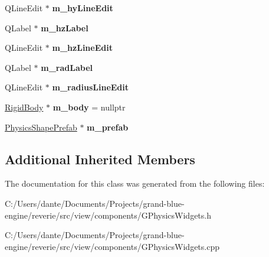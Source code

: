 \begin{DoxyCompactItemize}
\mbox{\label{classrev_1_1_view_1_1_physics_geometry_widget_a55538da4e7cc7f5175d896ad53b861d6}} 
Q\+Line\+Edit $\ast$ {\bfseries m\+\_\+hy\+Line\+Edit}
\item 
\mbox{\label{classrev_1_1_view_1_1_physics_geometry_widget_ab5dd9e36704cd247a9746c7bad36e3c9}} 
Q\+Label $\ast$ {\bfseries m\+\_\+hz\+Label}
\item 
\mbox{\label{classrev_1_1_view_1_1_physics_geometry_widget_a6e946359f3389090ef0d66a52d426b47}} 
Q\+Line\+Edit $\ast$ {\bfseries m\+\_\+hz\+Line\+Edit}
\item 
\mbox{\label{classrev_1_1_view_1_1_physics_geometry_widget_a2fc466dfa0c29f8f5c99641ea005714d}} 
Q\+Label $\ast$ {\bfseries m\+\_\+rad\+Label}
\item 
\mbox{\label{classrev_1_1_view_1_1_physics_geometry_widget_aa803518a721875848b245b9c4a038019}} 
Q\+Line\+Edit $\ast$ {\bfseries m\+\_\+radius\+Line\+Edit}
\item 
\mbox{\label{classrev_1_1_view_1_1_physics_geometry_widget_a59e96a565a33fe544d8dc5e82c1b3a81}} 
\mbox{\hyperlink{classrev_1_1_rigid_body}{Rigid\+Body}} $\ast$ {\bfseries m\+\_\+body} = nullptr
\item 
\mbox{\label{classrev_1_1_view_1_1_physics_geometry_widget_a53049383c37b0d48ca300c9f89159103}} 
\mbox{\hyperlink{classrev_1_1_physics_shape_prefab}{Physics\+Shape\+Prefab}} $\ast$ {\bfseries m\+\_\+prefab}
\end{DoxyCompactItemize}
\subsection*{Additional Inherited Members}


The documentation for this class was generated from the following files\+:\begin{DoxyCompactItemize}
\item 
C\+:/\+Users/dante/\+Documents/\+Projects/grand-\/blue-\/engine/reverie/src/view/components/G\+Physics\+Widgets.\+h\item 
C\+:/\+Users/dante/\+Documents/\+Projects/grand-\/blue-\/engine/reverie/src/view/components/G\+Physics\+Widgets.\+cpp\end{DoxyCompactItemize}
